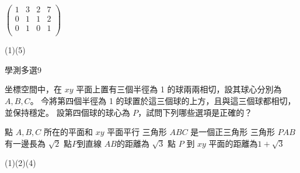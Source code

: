 \begin{QUESTION}
\begin{QBODY}
\begin{QOPS}
				\QOP $\left( \begin{array}{cccc} 1 & 3 & 2 & 7 \\0 & 1 & 1 & 2 \\0 & 1 & 0 & 1 \\\end{array}\right)$
			\end{QOPS}
        \end{QBODY}
        \begin{QFROMS}
        \end{QFROMS}
        \begin{QTAGS}\end{QTAGS}
        \begin{QANS}
            (1)(5)
        \end{QANS}
        \begin{QSOLLIST}
        \end{QSOLLIST}
        \begin{QEMPTYSPACE}
        \end{QEMPTYSPACE}
    \end{QUESTION}
    \begin{QUESTION}
        \begin{ExamInfo}{96}{學測}{多選}{9}
        \end{ExamInfo}
        \begin{ExamAnsRateInfo}{42}{70}{39}{17}
        \end{ExamAnsRateInfo}
        \begin{QBODY}
            坐標空間中，在 $xy$ 平面上置有三個半徑為 1 的球兩兩相切，設其球心分別為 $A,B,C$。
			今將第四個半徑為 1 的球置於這三個球的上方，且與這三個球都相切，並保持穩定。
			設第四個球的球心為 $P$，試問下列哪些選項是正確的？
			\begin{QOPS}
			 \QOP 點 $A,B,C$ 所在的平面和 $xy$  平面平行
			 \QOP 三角形 $ABC$ 是一個正三角形 
			 \QOP 三角形 $PAB$ 有一邊長為 $\sqrt{2}$ 
			 \QOP 點$P$到直線 $AB$的距離為 $\sqrt{3}$ 
			 \QOP 點 $P$ 到 $xy$ 平面的距離為$1+ \sqrt{3}$
			\end{QOPS}
        \end{QBODY}
        \begin{QFROMS}
        \end{QFROMS}
        \begin{QTAGS}\end{QTAGS}
        \begin{QANS}
            (1)(2)(4)
        \end{QANS}
        \begin{QSOLLIST}
        \end{QSOLLIST}
        \begin{QEMPTYSPACE}
        \end{QEMPTYSPACE}
    \end{QUESTION}
